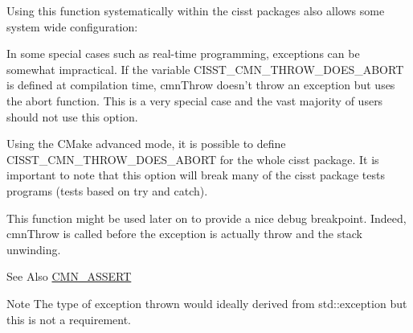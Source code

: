 Using this function systematically within the cisst packages also allows some system wide configuration\-:

\begin{DoxyItemize}
\item In some special cases such as real-\/time programming, exceptions can be somewhat impractical. If the variable {\ttfamily C\-I\-S\-S\-T\-\_\-\-C\-M\-N\-\_\-\-T\-H\-R\-O\-W\-\_\-\-D\-O\-E\-S\-\_\-\-A\-B\-O\-R\-T} is defined at compilation time, cmn\-Throw doesn't throw an exception but uses the {\ttfamily abort} function. This is a very special case and the vast majority of users should not use this option.\par
Using the C\-Make advanced mode, it is possible to define C\-I\-S\-S\-T\-\_\-\-C\-M\-N\-\_\-\-T\-H\-R\-O\-W\-\_\-\-D\-O\-E\-S\-\_\-\-A\-B\-O\-R\-T for the whole cisst package. It is important to note that this option will break many of the cisst package tests programs (tests based on {\ttfamily try} and {\ttfamily catch}).\end{DoxyItemize}
\begin{DoxyItemize}
\item This function might be used later on to provide a nice debug breakpoint. Indeed, cmn\-Throw is called before the exception is actually throw and the stack unwinding.\end{DoxyItemize}
\begin{DoxySeeAlso}{See Also}
\hyperlink{group__cisst_common_ga6a12b7031ea38ac5bf5937b8633c97ff}{C\-M\-N\-\_\-\-A\-S\-S\-E\-R\-T}
\end{DoxySeeAlso}
\begin{DoxyNote}{Note}
The type of exception thrown would ideally derived from {\ttfamily std\-::exception} but this is not a requirement. 
\end{DoxyNote}

